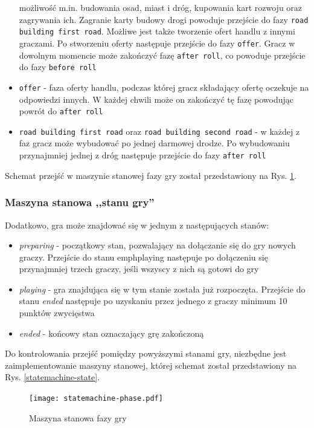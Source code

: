\documentclass[a4paper,12pt]{article}
\providecommand{\imref}[1]{Rys. \ref{#1}} %
\begin{document}
\begin{itemize}
  możliwość m.in. budowania osad, miast i dróg, kupowania kart rozwoju
  oraz zagrywania ich. Zagranie karty budowy drogi powoduje przejście
  do fazy \texttt{road building first road}. Możliwe jest także
  tworzenie ofert handlu z innymi graczami. Po stworzeniu oferty
  następuje przejście do fazy \texttt{offer}. Gracz w dowolnym momencie
  może zakończyć fazę \texttt{after roll}, co powoduje przejście do fazy
  \texttt{before roll}
\item \texttt{offer} - faza oferty handlu, podczas której gracz
  składający ofertę oczekuje na odpowiedzi innych. W każdej chwili
  może on zakończyć tę fazę powodując powrót do \texttt{after roll}
\item \texttt{road building first road} oraz \texttt{road building second
    road} - w każdej z faz gracz może wybudować po jednej darmowej
  drodze. Po wybudowaniu przynajmniej jednej z dróg następuje
  przejście do fazy \texttt{after roll}
\end{itemize}

Schemat przejść w maszynie stanowej fazy gry został przedstawiony na
\imref{statemachine-phase}.

\subsubsection{Maszyna stanowa ,,stanu gry''}

Dodatkowo, gra może znajdować się w jednym z następujących stanów:

\begin{itemize}
\item \emph{preparing} - początkowy stan, pozwalający na
  dołączanie się do gry nowych graczy. Przejście do stanu
  emph{playing} następuje po dołączeniu się przynajmniej trzech
  graczy, jeśli wszyscy z nich są gotowi do gry
\item \emph{playing} - gra znajdująca się w tym stanie została już
  rozpoczęta. Przejście do stanu \emph{ended} następuje po uzyskaniu
  przez jednego z graczy minimum 10 punktów zwycięstwa
\item \emph{ended} - końcowy stan oznaczający grę zakończoną
\end{itemize}

Do kontrolowania przejść pomiędzy powyższymi stanami gry, niezbędne
jest zaimplementowanie maszyny stanowej, której schemat został
przedstawiony na \imref{statemachine-state}.

\begin{figure}[ht]
  \begin{center}
    \texttt{[image: statemachine-phase.pdf]}
  \end{center}
  \caption{Maszyna stanowa fazy gry}
  \label{statemachine-phase}
\end{figure}
\end{document}

